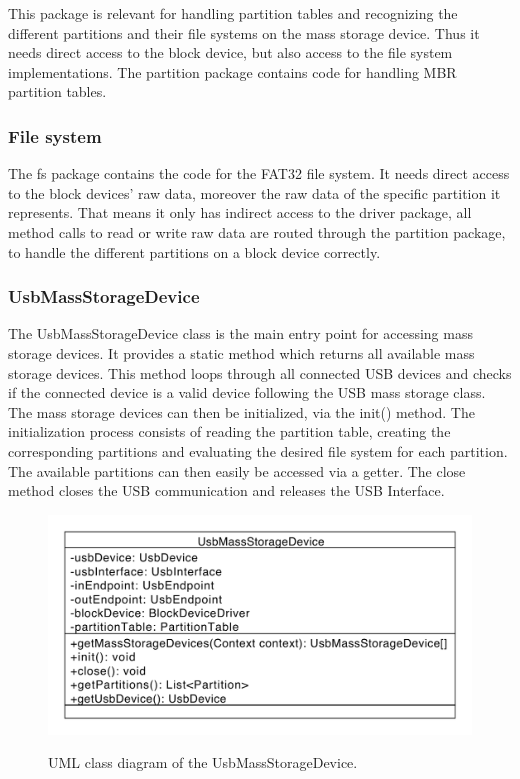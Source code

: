 This package is relevant for handling partition tables and recognizing the different partitions and their file systems on the mass storage device. Thus it needs direct access to the block device, but also access to the file system implementations. The partition package contains code for handling MBR partition tables.

\subsubsection{File system}

The fs package contains the code for the FAT32 file system. It needs direct access to the block devices' raw data, moreover the raw data of the specific partition it represents. That means it only has indirect access to the driver package, all method calls to read or write raw data are routed through the partition package, to handle the different partitions on a block device correctly.

\subsubsection{UsbMassStorageDevice}

The UsbMassStorageDevice class is the main entry point for accessing mass storage devices. It provides a static method which returns all available mass storage devices. This method loops through all connected USB devices and checks if the connected device is a valid device following the USB mass storage class. The mass storage devices can then be initialized, via the init() method. The initialization process consists of reading the partition table, creating the corresponding partitions and evaluating the desired file system for each partition.  The available partitions can then easily be accessed via a getter. The close method closes the USB communication and releases the USB Interface.

\begin{figure}[h!]
\caption{UML class diagram of the UsbMassStorageDevice.}
\centering
\includegraphics[scale=0.85]{figures/usb_mass_dev}
\label{figure:mass_dev}
\end{figure}

